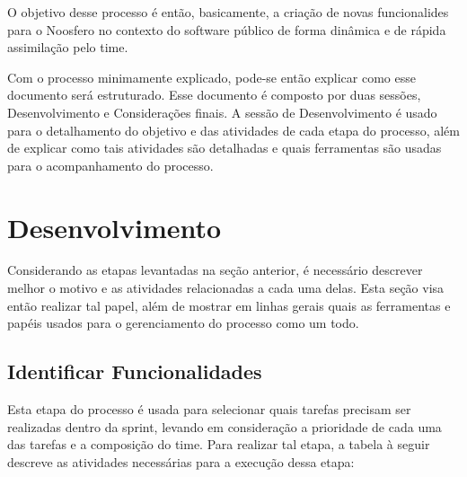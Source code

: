 \documentclass[a4paper, 11pt]{article}
\begin{document}
O objetivo desse processo é então, basicamente, a criação de novas funcionalides
para o Noosfero no contexto do software público de forma dinâmica e de rápida
assimilação pelo time.

Com o processo minimamente explicado, pode-se então explicar como esse documento
será estruturado. Esse documento é composto por duas sessões, Desenvolvimento e Considerações
finais. A sessão de Desenvolvimento é usado para o detalhamento do objetivo e das atividades de
cada etapa do processo, além de explicar como tais atividades são detalhadas e
quais ferramentas são usadas para o acompanhamento do processo.


\section*{Desenvolvimento}

Considerando as etapas levantadas na seção anterior, é necessário descrever
melhor o motivo e as atividades relacionadas a cada uma delas. Esta seção visa
então realizar tal papel, além de mostrar em linhas gerais quais as ferramentas
e papéis usados para o gerenciamento do processo como um todo.

\subsection*{Identificar Funcionalidades}

Esta etapa do processo é usada para selecionar quais tarefas precisam ser
realizadas dentro da sprint, levando em consideração a prioridade de cada uma
das tarefas e a composição do time. Para realizar tal etapa, a tabela à seguir
descreve as atividades necessárias para a execução dessa etapa:
\end{document}
